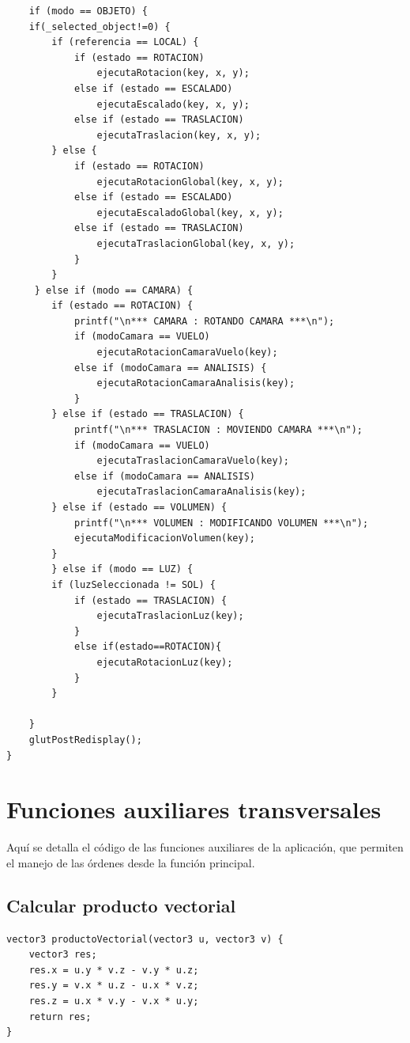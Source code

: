 \documentclass[12pt,a4paper]{article}
\begin{document}
\begin{lstlisting}
    if (modo == OBJETO) {
	if(_selected_object!=0) {
		if (referencia == LOCAL) {
		    if (estado == ROTACION)
		        ejecutaRotacion(key, x, y);
		    else if (estado == ESCALADO)
		        ejecutaEscalado(key, x, y);
		    else if (estado == TRASLACION)
		        ejecutaTraslacion(key, x, y);
		} else {
		    if (estado == ROTACION)
		        ejecutaRotacionGlobal(key, x, y);
		    else if (estado == ESCALADO)
		        ejecutaEscaladoGlobal(key, x, y);
		    else if (estado == TRASLACION)
		        ejecutaTraslacionGlobal(key, x, y);
		    }
		}
	 } else if (modo == CAMARA) {
		if (estado == ROTACION) {
		    printf("\n*** CAMARA : ROTANDO CAMARA ***\n");
		    if (modoCamara == VUELO)
		        ejecutaRotacionCamaraVuelo(key);
		    else if (modoCamara == ANALISIS) {
		        ejecutaRotacionCamaraAnalisis(key);
		    }
		} else if (estado == TRASLACION) {
		    printf("\n*** TRASLACION : MOVIENDO CAMARA ***\n");
		    if (modoCamara == VUELO)
		        ejecutaTraslacionCamaraVuelo(key);
		    else if (modoCamara == ANALISIS)
		        ejecutaTraslacionCamaraAnalisis(key);
		} else if (estado == VOLUMEN) {
		    printf("\n*** VOLUMEN : MODIFICANDO VOLUMEN ***\n");
		    ejecutaModificacionVolumen(key);
		}
	    } else if (modo == LUZ) {
		if (luzSeleccionada != SOL) {
		    if (estado == TRASLACION) {
		        ejecutaTraslacionLuz(key);
		    }
		    else if(estado==ROTACION){
		        ejecutaRotacionLuz(key);
		    }
		}
	
    }
    glutPostRedisplay();
}

\end{lstlisting}







\newpage

\section{Funciones auxiliares transversales}

Aquí se detalla el código de las funciones auxiliares de la aplicación, que permiten el manejo de las órdenes desde la función principal.

\subsection{Calcular producto vectorial}

\begin{lstlisting}
vector3 productoVectorial(vector3 u, vector3 v) {
    vector3 res;
    res.x = u.y * v.z - v.y * u.z;
    res.y = v.x * u.z - u.x * v.z;
    res.z = u.x * v.y - v.x * u.y;
    return res;
}

\end{lstlisting}
\end{document}
